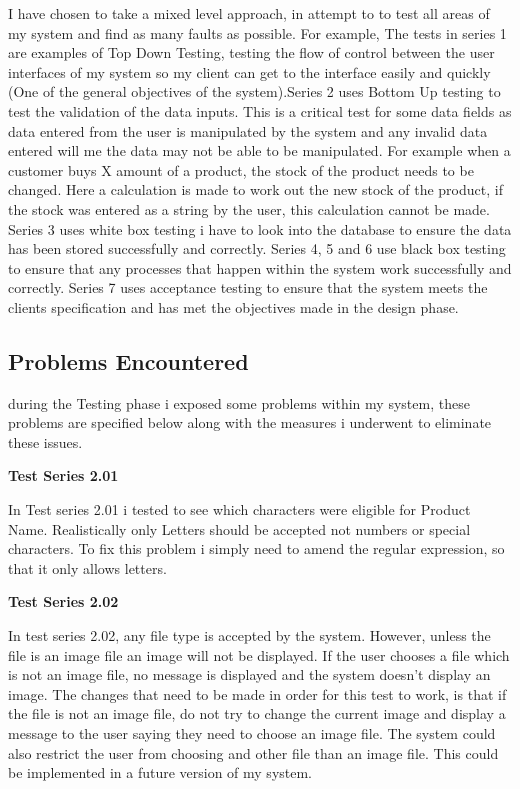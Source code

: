 I have chosen to take a mixed level approach, in attempt to to test all areas of my system and find as many faults as possible. For example,  The tests in series 1 are examples of Top Down Testing, testing the flow of control between the user interfaces of my system so my client can get to the interface easily and quickly (One of the general objectives of the system).Series 2 uses Bottom Up testing to test the validation of the data inputs. This is a critical test for some data fields as data entered from the user is manipulated by the system and any invalid data entered will me the data may not be able to be manipulated. For example when a customer buys X amount of a product, the stock of the product needs to be changed. Here a calculation is made to work out the new stock of the product, if the stock was entered as a string by the user, this calculation cannot be made. Series 3 uses white box testing i have to look into the database to ensure the data has been stored successfully and correctly. Series 4, 5 and 6 use black box testing to ensure that any processes that happen within the system work successfully and correctly. Series 7 uses acceptance testing to ensure that the system meets the clients specification and has met the objectives made in the design phase.

\subsection{Problems Encountered}

during the Testing phase i exposed some problems within my system, these problems are specified below along with the measures i underwent to eliminate these issues. 

\textbf{Test Series 2.01}

In Test series 2.01 i tested to see which characters were eligible for Product Name. Realistically only Letters should be accepted not numbers or special characters. To fix this problem i simply need to amend the regular expression, so that it only allows letters. 


\textbf{Test Series 2.02}

In test series 2.02, any file type is accepted by the system. However, unless the file is an image file an image will not be displayed. If the user chooses a file which is not an image file, no message is displayed and the system doesn't display an image. The changes that need to be made in order for this test to work, is that if the file is not an image file, do not try to change the current image and display a message to the user saying they need to choose an image file. The system could also restrict the user from choosing and other file than an image file. This could be implemented in a future version of my system.


